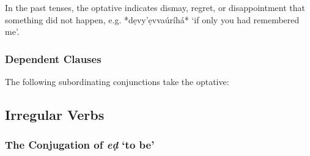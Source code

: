 \documentclass[a4paper, 12pt, oneside, final]{article}
\newlength{\EnumItemSep} \EnumItemSep-3pt
\newenvironment { dlist } [1] [{}] {
    \vspace { -.5em }
    \begingroup
    \def\descriptionlabel ##1 {\hspace\labelsep \normalfont #1 ##1}
    \settowidth \leftmargini { 99.\hskip\labelsep }
    \begin { description }
    \itemsep \EnumItemSep
} {
    \end { description }
    \endgroup
    \vspace { -.5em }
}
\begin{document}
In the past tenses, the optative indicates dismay, regret, or disappointment that something did not happen, e.g.
 *dẹvy’ẹvvaúríhá* ‘if only you had remembered me’.

\subsubsection{Dependent Clauses}
The following subordinating conjunctions take the optative:



\subsection{Irregular Verbs}\label{subsec:irregular-verbs}
\subsubsection{The Conjugation of \textit{eḍ} ‘to be’}
\end{document}
